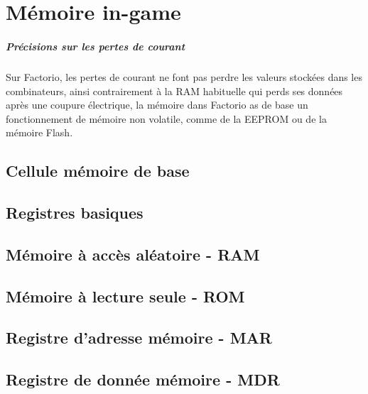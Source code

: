\chapter{Mémoire in-game}

\paragraph{Précisions sur les pertes de courant}
Sur Factorio, les pertes de courant ne font pas perdre les valeurs stockées dans les combinateurs, ainsi contrairement à la RAM habituelle qui perds ses données après une coupure électrique, la mémoire dans Factorio as de base un fonctionnement de mémoire non volatile, comme de la EEPROM ou de la mémoire Flash.

\section{Cellule mémoire de base}

\section{Registres basiques}

\section{Mémoire à accès aléatoire - RAM}

\section{Mémoire à lecture seule - ROM}

\section{Registre d'adresse mémoire - MAR}

\section{Registre de donnée mémoire - MDR}
